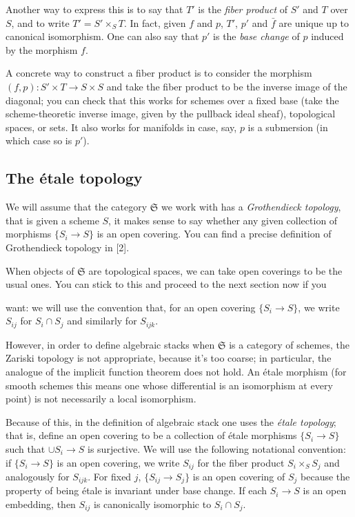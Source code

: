 \documentclass[12pt]{memoir}
\begin{document}
Another way to express this is to say that $T'$ is the \emph{fiber product} of $S'$ and $T$ over $S$, and to write $T' = S' \times_S T$. In fact, given $f$ and $p$, $T'$, $p'$ and $\bar{f}$ are unique up to canonical isomorphism. One can also say that $p'$ is the \emph{base change} of $p$ induced by the morphism $f$.

A concrete way to construct a fiber product is to consider the morphism $(f, p)\colon S' \times T \to S \times S$ and take the fiber product to be the inverse image of the diagonal; you can check that this works for schemes over a fixed base (take the scheme-theoretic inverse image, given by the pullback ideal sheaf), topological spaces, or sets. It also works for manifolds in case, say, $p$ is a submersion (in which case so is $p'$).

\subsection{The \'etale topology}

We will assume that the category $\mathfrak{S}$ we work with has a \emph{Grothendieck topology}, that is given a scheme $S$, it makes sense to say whether any given collection of morphisms $\{S_i \to S\}$ is an open covering. You can find a precise definition of Grothendieck topology in [2].

When objects of $\mathfrak{S}$ are topological spaces, we can take open coverings to be the usual ones. You can stick to this and proceed to the next section now if you


want: we will use the convention that, for an open covering $\{S_i \to S\}$, we write $S_{ij}$ for $S_i \cap S_j$ and similarly for $S_{ijk}$.

However, in order to define algebraic stacks when $\mathfrak{S}$ is a category of schemes, the Zariski topology is not appropriate, because it's too coarse; in particular, the analogue of the implicit function theorem does not hold. An \'etale morphism (for smooth schemes this means one whose differential is an isomorphism at every point) is not necessarily a local isomorphism.

Because of this, in the definition of algebraic stack one uses the \emph{\'etale topology}; that is, define an open covering to be a collection of \'etale morphisms $\{S_i \to S\}$ such that $\cup S_i \to S$ is surjective. We will use the following notational convention: if $\{S_i \to S\}$ is an open covering, we write $S_{ij}$ for the fiber product $S_i \times_S S_j$ and analogously for $S_{ijk}$. For fixed $j$, $\{S_{ij} \to S_j\}$ is an open covering of $S_j$ because the property of being \'etale is invariant under base change. If each $S_i \to S$ is an open embedding, then $S_{ij}$ is canonically isomorphic to $S_i \cap S_j$.
\end{document}
